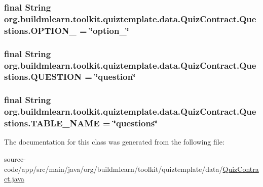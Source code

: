 \subsubsection[{\texorpdfstring{O\+P\+T\+I\+O\+N\+\_\+4}{OPTION_4}}]{\setlength{\rightskip}{0pt plus 5cm}final String org.\+buildmlearn.\+toolkit.\+quiztemplate.\+data.\+Quiz\+Contract.\+Questions.\+O\+P\+T\+I\+O\+N\+\_ = \char`\"{}option\+\_\char`\"{}\hspace{0.3cm}{\ttfamily [static]}}\hypertarget{classorg_1_1buildmlearn_1_1toolkit_1_1quiztemplate_1_1data_1_1QuizContract_1_1Questions_a5a9443e11454eb871b933f2e06328821}{}\label{classorg_1_1buildmlearn_1_1toolkit_1_1quiztemplate_1_1data_1_1QuizContract_1_1Questions_a5a9443e11454eb871b933f2e06328821}
\subsubsection[{\texorpdfstring{Q\+U\+E\+S\+T\+I\+ON}{QUESTION}}]{\setlength{\rightskip}{0pt plus 5cm}final String org.\+buildmlearn.\+toolkit.\+quiztemplate.\+data.\+Quiz\+Contract.\+Questions.\+Q\+U\+E\+S\+T\+I\+ON = \char`\"{}question\char`\"{}\hspace{0.3cm}{\ttfamily [static]}}\hypertarget{classorg_1_1buildmlearn_1_1toolkit_1_1quiztemplate_1_1data_1_1QuizContract_1_1Questions_a59ec9c0d785a97bb09da330a6b6351ca}{}\label{classorg_1_1buildmlearn_1_1toolkit_1_1quiztemplate_1_1data_1_1QuizContract_1_1Questions_a59ec9c0d785a97bb09da330a6b6351ca}
\subsubsection[{\texorpdfstring{T\+A\+B\+L\+E\+\_\+\+N\+A\+ME}{TABLE_NAME}}]{\setlength{\rightskip}{0pt plus 5cm}final String org.\+buildmlearn.\+toolkit.\+quiztemplate.\+data.\+Quiz\+Contract.\+Questions.\+T\+A\+B\+L\+E\+\_\+\+N\+A\+ME = \char`\"{}questions\char`\"{}\hspace{0.3cm}{\ttfamily [static]}}\hypertarget{classorg_1_1buildmlearn_1_1toolkit_1_1quiztemplate_1_1data_1_1QuizContract_1_1Questions_a3c4e50dd43845e4bce187634213f567f}{}\label{classorg_1_1buildmlearn_1_1toolkit_1_1quiztemplate_1_1data_1_1QuizContract_1_1Questions_a3c4e50dd43845e4bce187634213f567f}


The documentation for this class was generated from the following file\+:\begin{DoxyCompactItemize}
\item 
source-\/code/app/src/main/java/org/buildmlearn/toolkit/quiztemplate/data/\hyperlink{QuizContract_8java}{Quiz\+Contract.\+java}\end{DoxyCompactItemize}
